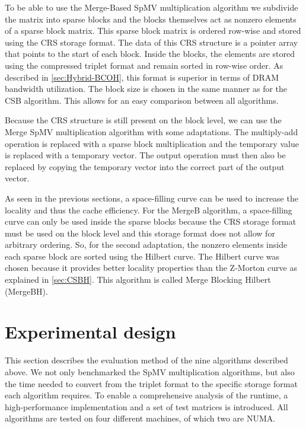 \documentclass{siamart220329}
\begin{document}
To be able to use the Merge-Based SpMV multiplication algorithm we subdivide the matrix into sparse blocks and the blocks themselves act as nonzero elements of a sparse block matrix. This sparse block matrix is ordered row-wise and stored using the CRS storage format. The data of this CRS structure is a pointer array that points to the start of each block. Inside the blocks, the elements are stored using the compressed triplet format and remain sorted in row-wise order. As described in \cref{sec:Hybrid-BCOH}, this format is superior in terms of DRAM bandwidth utilization. The block size is chosen in the same manner as for the CSB algorithm. This allows for an easy comparison between all algorithms.

Because the CRS structure is still present on the block level, we can use the Merge SpMV multiplication algorithm with some adaptations. The multiply-add operation is replaced with a sparse block multiplication and the temporary value is replaced with a temporary vector. The output operation must then also be replaced by copying the temporary vector into the correct part of the output vector.

As seen in the previous sections, a space-filling curve can be used to increase the locality and thus the cache efficiency. For the MergeB algorithm, a space-filling curve can only be used inside the sparse blocks because the CRS storage format must be used on the block level and this storage format does not allow for arbitrary ordering. So, for the second adaptation, the nonzero elements inside each sparse block are sorted using the Hilbert curve. The Hilbert curve was chosen because it provides better locality properties than the Z-Morton curve as explained in \cref{sec:CSBH}. This algorithm is called Merge Blocking Hilbert (MergeBH).

\section{Experimental design}\label{sec:expDesign}
This section describes the evaluation method of the nine algorithms described above. We not only benchmarked the SpMV multiplication algorithms, but also the time needed to convert from the triplet format to the specific storage format each algorithm requires. To enable a comprehensive analysis of the runtime, a high-performance implementation and a set of test matrices is introduced. All algorithms are tested on four different machines, of which two are NUMA.
\end{document}
